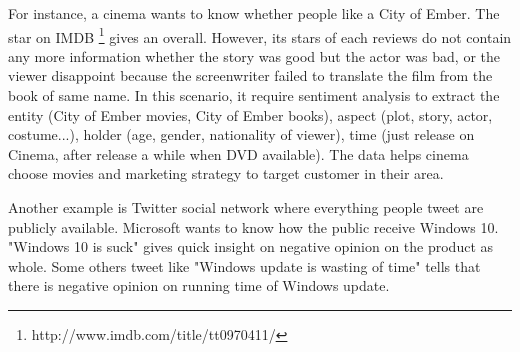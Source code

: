 For instance, a cinema wants to know whether people like a City of Ember. The star on IMDB \footnote{http://www.imdb.com/title/tt0970411/} gives an overall. However, its stars of each reviews do not contain any more information whether the story was good but the actor was bad, or the viewer disappoint because the screenwriter failed to translate the film from the book of same name. In this scenario, it require sentiment analysis to extract the entity (City of Ember movies, City of Ember books), aspect (plot, story, actor, costume...), holder (age, gender, nationality of viewer), time (just release on Cinema, after release a while when DVD available). The data helps cinema choose movies and marketing strategy to target customer in their area.

Another example is Twitter social network where everything people tweet are publicly available. Microsoft wants to know how the public receive Windows 10. "Windows 10 is suck" gives quick insight on negative opinion on the product as whole. Some others tweet like "Windows update is wasting of time" tells that there is negative opinion on running time of Windows update.


